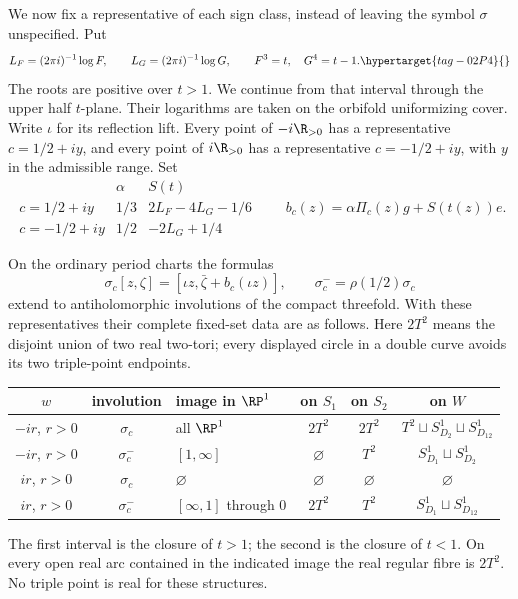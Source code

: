 We now fix a representative of each sign class, instead of leaving the
symbol $\sigma$ unspecified. Put
\[
 L_F=(2\pi i)^{-1}\log F,\qquad L_G=(2\pi i)^{-1}\log G,
 \qquad F^3=t,\quad G^4=t-1.
 \hypertarget{tag-02P4}{}\label{mapsI:real-eq-1}
\]
The roots are positive over $t>1$. We continue from that interval
through the upper half $t$-plane. Their logarithms are taken on the
orbifold uniformizing cover. Write $\iota$ for its reflection lift.
Every point of $-i\R_{>0}$ has a representative $c=1/2+iy$, and every
point of $i\R_{>0}$ has a representative $c=-1/2+iy$, with $y$ in the
admissible range. Set
\[
\begin{array}{c|c|c}
 &\alpha&S(t)\\\hline
 c=1/2+iy&1/3&2L_F-4L_G-1/6\\
 c=-1/2+iy&1/2&-2L_G+1/4
\end{array}
\qquad b_c(z)=\alpha\Pi_c(z)g+S(t(z))e.
\label{mapsI:real-eq-2}
\]

\begin{theorem}\hypertarget{tag-02PF}{}\label{mapsI:src:A.3.2}

On the ordinary period charts the formulas
\[
 \sigma_c[z,\zeta]=[\iota z,\bar\zeta+b_c(\iota z)],
 \qquad \sigma_c^- =\rho(1/2)\sigma_c
 \label{mapsI:real-eq-3}
\]
extend to antiholomorphic involutions of the compact threefold.
With these representatives their complete fixed-set data are as follows.
Here $2T^2$ means the disjoint union of two real two-tori; every displayed
circle in a double curve avoids its two triple-point endpoints.
\begin{center}\small
\begin{tabular}{cclccc}
\toprule
$w$&involution&image in $\RP^1$&on $S_1$&on $S_2$&on $W$\\
\midrule
$-ir$, $r>0$&$\sigma_c$&all $\RP^1$&$2T^2$&$2T^2$&$T^2\sqcup S^1_{D_2}\sqcup S^1_{D_{12}}$\\
$-ir$, $r>0$&$\sigma_c^-$&$[1,\infty]$&$\varnothing$&$T^2$&$S^1_{D_1}\sqcup S^1_{D_2}$\\
$ir$, $r>0$&$\sigma_c$&$\varnothing$&$\varnothing$&$\varnothing$&$\varnothing$\\
$ir$, $r>0$&$\sigma_c^-$&$[\infty,1]$ through $0$&$2T^2$&$T^2$&$S^1_{D_1}\sqcup S^1_{D_{12}}$\\
\bottomrule
\end{tabular}
\end{center}
The first interval is the closure of $t>1$; the second is the closure
of $t<1$. On every open real arc contained in the indicated image the
real regular fibre is $2T^2$. No triple point is real for these structures.
\end{theorem}



